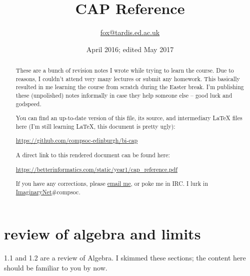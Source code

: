 \documentclass[10pt,a4paper]{report}
\begin{document}

\title{CAP Reference}
\author{\href{mailto:fox@tardis.ed.ac.uk}{fox@tardis.ed.ac.uk}}
\date{April 2016; edited May 2017}


\begin{titlepage}
\maketitle
\thispagestyle{empty}
\end{titlepage}


\renewcommand{\abstractname}{calculus and its applications}
\begin{abstract}
These are a bunch of revision notes I wrote while trying to learn the course. Due to reasons, I couldn't attend very many lectures or submit any homework. This basically resulted in me learning the course from scratch during the Easter break. I'm publishing these (unpolished) notes informally in case they help someone else -- good luck and godspeed.

You can find an up-to-date version of this file, its source, and intermediary LaTeX files here (I'm still learning LaTeX, this document is pretty ugly):

\noindent \url{https://github.com/compsoc-edinburgh/bi-cap}

A direct link to this rendered document can be found here:

\noindent \url{https://betterinformatics.com/static/year1/cap_reference.pdf}


If you have any corrections, please \href{mailto:fox@tardis.ed.ac.uk}{email me}, or poke me in IRC. I lurk in \href{http://imaginarynet.uk}{ImaginaryNet}\#compsoc.

\thispagestyle{empty}
\hypersetup{pageanchor=false} %
\end{abstract}

\newpage

\hypersetup{pageanchor=true}
\tableofcontents




\chapter{review of algebra and limits}

1.1 and 1.2 are a review of Algebra. I skimmed these sections; the content here should be familiar to you by now.
\end{document}
